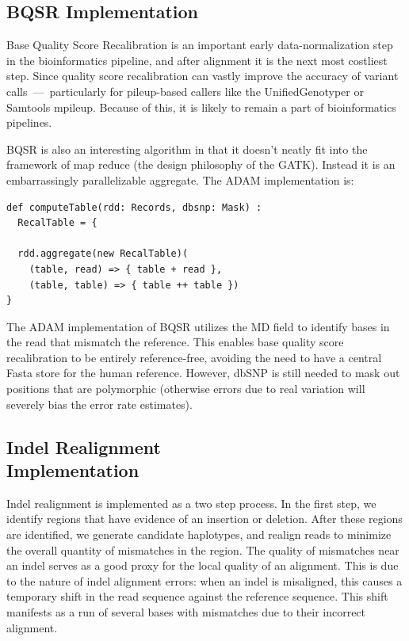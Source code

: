 \documentclass{acm_proc_article-sp}
\begin{document}
\subsection{BQSR Implementation}
\label{sec:bqsr-implementation}

Base Quality Score Recalibration is an important early data-normalization step in the bioinformatics pipeline, and after alignment
it is the next most costliest step. Since quality score recalibration can vastly improve the accuracy of variant calls~---~particularly for
pileup-based callers like the UnifiedGenotyper or Samtools mpileup. Because of this, it is likely to remain a part of bioinformatics pipelines.

BQSR is also an interesting algorithm in that it doesn't neatly fit into the framework of map reduce (the design philosophy of the GATK).
Instead it is an embarrassingly parallelizable aggregate. The ADAM implementation is:

\begin{lstlisting}
def computeTable(rdd: Records, dbsnp: Mask) :
  RecalTable = {
  
  rdd.aggregate(new RecalTable)(
    (table, read) => { table + read },
    (table, table) => { table ++ table })
}
\end{lstlisting}

The ADAM implementation of BQSR utilizes the MD field to identify bases in the read that mismatch the reference. This enables
base quality score recalibration to be entirely reference-free, avoiding the need to have a central Fasta store for the human
reference. However, dbSNP is still needed to mask out positions that are polymorphic (otherwise errors due to real variation will
severely bias the error rate estimates).

\subsection{Indel Realignment\\Implementation}
\label{sec:indel-realignment-implementation}

Indel realignment is implemented as a two step process. In the first step, we identify regions that have evidence of an insertion or
deletion. After these regions are identified, we generate candidate haplotypes, and realign reads to minimize the overall quantity
of mismatches in the region. The quality of mismatches near an indel serves as a good proxy for the local quality of an alignment.
This is due to the nature of indel alignment errors: when an indel is misaligned, this causes a temporary shift in the read sequence
against the reference sequence. This shift manifests as a run of several bases with mismatches due to their incorrect alignment.
\end{document}
